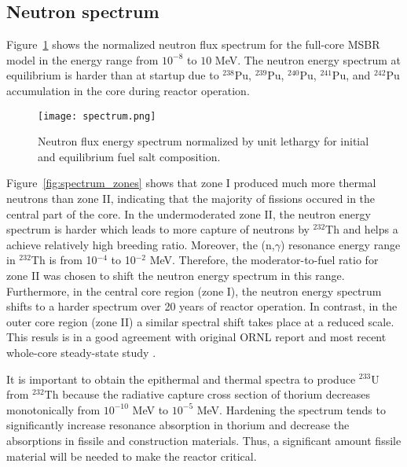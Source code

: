 \subsection{Neutron spectrum}
Figure~\ref{fig:spectrum} shows the normalized neutron flux spectrum for the full-core \gls{MSBR} model in the energy range from $10^{-8}$ to $10$ MeV. The neutron energy spectrum at equilibrium is harder than at startup due to $^{238}$Pu, $^{239}$Pu, $^{240}$Pu, $^{241}$Pu, and $^{242}$Pu accumulation in the core during reactor operation. 
\begin{figure}[ht!] %
  \centering
  \texttt{[image: spectrum.png]} 
  \caption{Neutron flux energy spectrum normalized by unit lethargy for initial and equilibrium fuel salt composition.}
  \label{fig:spectrum}
\end{figure}
Figure~\ref{fig:spectrum_zones} shows that zone I produced much more thermal neutrons than zone II, indicating that the majority of fissions occured in the central part of the core. In the undermoderated zone II, the neutron energy spectrum is harder which leads to more capture of neutrons by $^{232}$Th and helps a achieve relatively high breeding ratio. Moreover, the (n,$\gamma$) resonance energy range in $^{232}$Th is from 10$^{-4}$ to 10$^{-2}$ MeV. Therefore, the moderator-to-fuel ratio for zone II was chosen to shift the neutron energy spectrum in this range. Furthermore, in the central core region (zone I), the neutron energy spectrum shifts to a harder spectrum over 20 years of reactor operation. In contrast, in the outer core region (zone II) a similar spectral shift takes place at a reduced scale. This resuls is in a good agreement with original ORNL report \cite{robertson_conceptual_1971} and most recent whole-core steady-state study \cite{park_whole_2015}.

It is important to obtain the epithermal and thermal spectra to produce $^{233}$U from $^{232}$Th because the radiative capture cross section of thorium decreases monotonically from $10^{-10}$ MeV to $10^{-5}$ MeV. Hardening the spectrum tends to significantly increase resonance absorption in thorium and decrease the absorptions in fissile and construction materials. Thus, a significant amount fissile material will be needed to make the reactor critical. 

